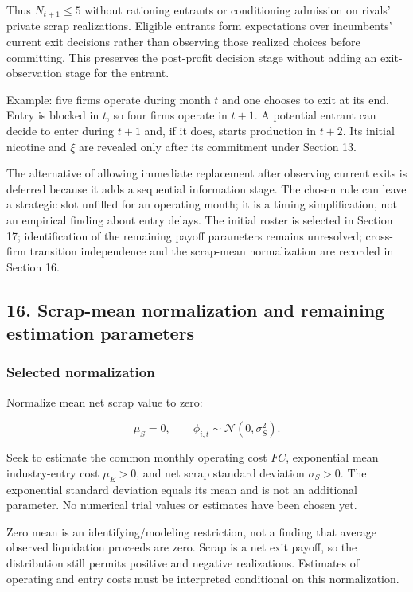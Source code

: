 \documentclass[10pt,]{article}
\begin{document}
Thus \(N_{t+1}\leq5\) without rationing entrants or conditioning
admission on rivals' private scrap realizations. Eligible entrants form
expectations over incumbents' current exit decisions rather than
observing those realized choices before committing. This preserves the
post-profit decision stage without adding an exit-observation stage for
the entrant.

Example: five firms operate during month \(t\) and one chooses to exit
at its end. Entry is blocked in \(t\), so four firms operate in \(t+1\).
A potential entrant can decide to enter during \(t+1\) and, if it does,
starts production in \(t+2\). Its initial nicotine and \(\xi\) are
revealed only after its commitment under Section 13.

The alternative of allowing immediate replacement after observing
current exits is deferred because it adds a sequential information
stage. The chosen rule can leave a strategic slot unfilled for an
operating month; it is a timing simplification, not an empirical finding
about entry delays. The initial roster is selected in Section 17;
identification of the remaining payoff parameters remains unresolved;
cross-firm transition independence and the scrap-mean normalization are
recorded in Section 16.

\subsection{16. Scrap-mean normalization and remaining estimation
parameters}\label{scrap-mean-normalization-and-remaining-estimation-parameters}

\subsubsection{Selected normalization}\label{selected-normalization}

Normalize mean net scrap value to zero:

\[
\mu_S=0,\qquad \phi_{i,t}\sim\mathcal{N}(0,\sigma_S^2).
\]

Seek to estimate the common monthly operating cost \(FC\), exponential
mean industry-entry cost \(\mu_E>0\), and net scrap standard deviation
\(\sigma_S>0\). The exponential standard deviation equals its mean and
is not an additional parameter. No numerical trial values or estimates
have been chosen yet.

Zero mean is an identifying/modeling restriction, not a finding that
average observed liquidation proceeds are zero. Scrap is a net exit
payoff, so the distribution still permits positive and negative
realizations. Estimates of operating and entry costs must be interpreted
conditional on this normalization.
\end{document}
